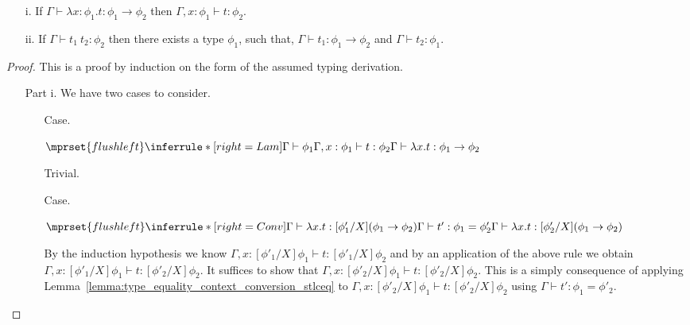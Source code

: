 \begin{lemma}
  \label{lemma:inversion_stlceq}
  \begin{itemize}
  \item[]
  \item[i.] If $\Gamma \vdash \lambda x:\phi_1.t:\phi_1 \to \phi_2$ then 
    $\Gamma, x:\phi_1 \vdash t:\phi_2$.

  \item[ii.] If $\Gamma \vdash t_1\ t_2:\phi_2$ then there exists a type $\phi_1$, such that, 
    $\Gamma \vdash t_1:\phi_1 \to \phi_2$ and $\Gamma \vdash t_2:\phi_1$.
  \end{itemize}
\end{lemma}
\begin{proof}
  This is a proof by induction on the form of the assumed typing derivation.
\begin{itemize}
\item[Part i.]  We have two cases to consider.\\
\begin{itemize}
\item[Case.]\ \\
  \begin{center}
    \begin{math}
      $$\mprset{flushleft}
      \inferrule* [right=Lam] {
        \Gamma \vdash \phi_1 
        \\
          \Gamma,x : \phi_1 \vdash t : \phi_2 
      }{\Gamma \vdash \lambda x.t : \phi_1 \rightarrow \phi_2}
    \end{math}
  \end{center}
  Trivial.
  
\item[Case.]\ \\
  \begin{center}
    \begin{math}
      $$\mprset{flushleft}
      \inferrule* [right=Conv] {
        \Gamma \vdash \lambda x.t:[\phi'_1/X](\phi_1 \rightarrow \phi_2)
        \\
        \Gamma \vdash t' : \phi_1 = \phi'_2
      }{\Gamma \vdash \lambda x.t: [\phi'_2/X](\phi_1 \rightarrow \phi_2)}
    \end{math} 
  \end{center}
  By the induction hypothesis we know $\Gamma,x:[\phi'_1/X]\phi_1 \vdash t:[\phi'_1/X]\phi_2$ and by an
  application of the above rule we obtain $\Gamma,x:[\phi'_1/X]\phi_1 \vdash t:[\phi'_2/X]\phi_2$.  It
  suffices to show that $\Gamma,x:[\phi'_2/X]\phi_1 \vdash t:[\phi'_2/X]\phi_2$.  This is a simply consequence 
  of applying Lemma~\ref{lemma:type_equality_context_conversion_stlceq} to $\Gamma,x:[\phi'_2/X]\phi_1 \vdash t:[\phi'_2/X]\phi_2$ using
  $\Gamma \vdash t' : \phi_1 = \phi'_2$.
\end{itemize}


\end{itemize}
\end{proof}
